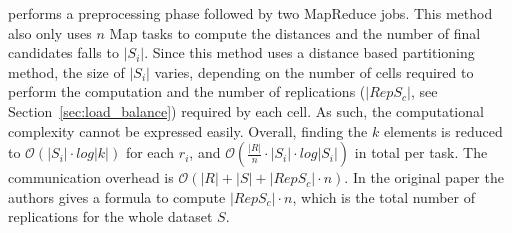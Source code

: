 {\bf \VO} \cite{Lu:2012:EPK:2336664.2336674} performs a preprocessing phase followed by two MapReduce jobs. This method 
also 
only uses $n$ Map tasks to compute the distances and the number of final candidates falls to $|S_i|$. Since this method 
uses a distance based partitioning method, 
the size of $|S_i|$ varies, depending on the number of cells
required to perform the computation and the number of replications ($\left|RepS_c\right|$, see 
Section~\ref{sec:load_balance}) required by each cell. As 
such, the computational complexity cannot be expressed easily.%
Overall, finding
the $k$ elements is reduced to $\mathcal{O}(\left|S_i\right| \cdot log\left|k\right|)$ for each $r_i$, and 
$\mathcal{O}(\frac{\left|R\right|}{n} \cdot \left|S_i\right| \cdot log\left|S_i\right|)$ in total per task.
 The communication overhead is $\mathcal{O}(\left|R\right| + \left|S\right| + \left|RepS_c\right|\cdot n)$. In the 
 original 
paper the authors gives a formula to compute $\left|RepS_c\right|\cdot n$, which is the total number of 
replications for the whole dataset $S$. %

